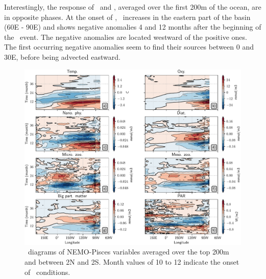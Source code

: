 Interestingly, the response of \phy\ and \phyd, averaged over the first 200m of the ocean, are in opposite phases. At the onset of \nino, \phy\ increases in the eastern part of the basin (60E - 90E) and shows negative anomalies 4 and 12 months after the beginning of the \nino\ event. The negative anomalies are located westward of the positive ones. The first occurring negative anomalies seem to find their sources between 0 and 30E, before being advected eastward. \\

 
\begin{figure}[h]	
    \begin{center}
        \includegraphics[scale=0.5]{figs/composite_hov_pisces.pdf}
    \caption{\hov\ diagrams of NEMO-Pisces variables averaged over the top 200m and between 2N and 2S. Month values of 10 to 12 indicate the onset of \nino\ conditions.}
    \label{fig:hov-pisces}
    \end{center}
\end{figure}

\clearpage
